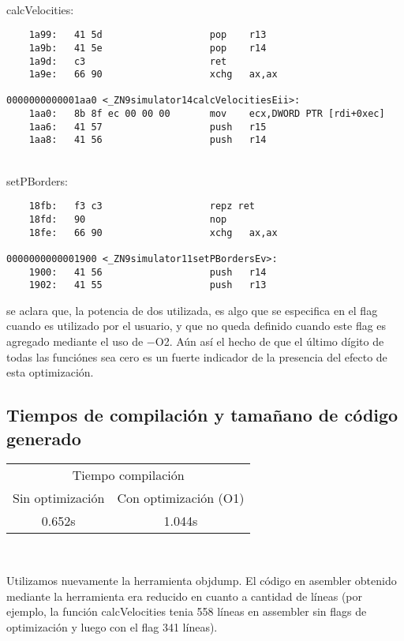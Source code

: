 ~\\
calcVelocities:
\begin{verbatim}
    1a99:   41 5d                   pop    r13
    1a9b:   41 5e                   pop    r14
    1a9d:   c3                      ret    
    1a9e:   66 90                   xchg   ax,ax

0000000000001aa0 <_ZN9simulator14calcVelocitiesEii>:
    1aa0:   8b 8f ec 00 00 00       mov    ecx,DWORD PTR [rdi+0xec]
    1aa6:   41 57                   push   r15
    1aa8:   41 56                   push   r14
\end{verbatim}
~\\
setPBorders:
\begin{verbatim}
    18fb:   f3 c3                   repz ret 
    18fd:   90                      nop
    18fe:   66 90                   xchg   ax,ax

0000000000001900 <_ZN9simulator11setPBordersEv>:
    1900:   41 56                   push   r14
    1902:   41 55                   push   r13
\end{verbatim}


se aclara que, la potencia de dos utilizada, es algo que se especifica en el flag cuando es utilizado por el usuario, y que no queda definido cuando este flag es agregado mediante el uso de $-$O2. Aún así el hecho de que el último dígito de todas las funciónes sea cero es un fuerte indicador de la presencia del efecto de esta optimización.




\subsection{Tiempos de compilación y tamañano de código generado}

\begin{center}
	\begin{tabular}{cc}  
		\toprule 
		\multicolumn{2}{c}{Tiempo compilación} \\
		\cmidrule(r){1-2}
		Sin optimización & Con optimización (O1) \\
		\midrule
		0.652s	&	1.044s	\\
		\bottomrule
	\end{tabular}\\
\end{center}


Utilizamos nuevamente la herramienta objdump. El código en asembler obtenido mediante la herramienta era reducido en cuanto a cantidad de líneas (por ejemplo, la función calcVelocities tenia 558 líneas en assembler sin flags de optimización y luego con el flag 341 líneas).

